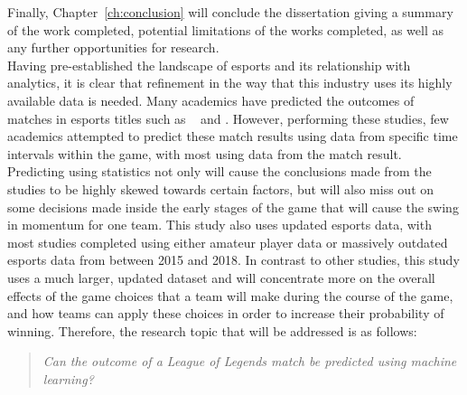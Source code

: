 Finally, Chapter~\ref{ch:conclusion} will conclude the dissertation giving a summary of the work completed, potential limitations of the works completed, as well as any further opportunities for research. \\

Having pre-established the landscape of esports and its relationship with analytics, it is clear that refinement in the way that this industry uses its highly available data is needed.
Many academics have predicted the outcomes of matches in esports titles such as ~\citet{ani2019victory} and \citet{lin2016league}.
However, performing these studies, few academics attempted to predict these match results using data from specific time intervals within the game, with most using data from the match result.
Predicting using statistics not only will cause the conclusions made from the studies to be highly skewed towards certain factors, but will also miss out on some decisions made inside the early stages of the game that will cause the swing in momentum for one team.
This study also uses updated esports data, with most studies completed using either amateur player data or massively outdated esports data from between 2015 and 2018.
In contrast to other studies, this study uses a much larger, updated dataset and will concentrate more on the overall effects of the game choices that a team will make during the course of the game, and how teams can apply these choices in order to increase their probability of winning.
Therefore, the research topic that will be addressed is as follows:

\begin{quote}  \emph{Can the outcome of a League of Legends match be predicted using machine learning?} \end{quote}
